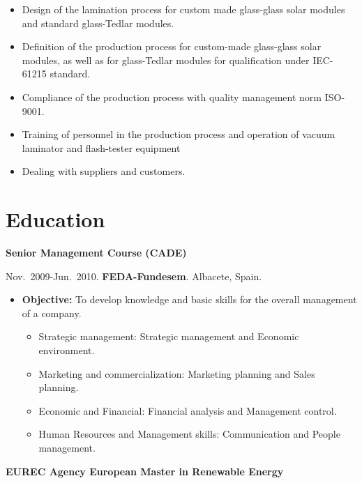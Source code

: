 \documentclass{article}
\begin{document}
\begin{itemize}\itemsep 0pt
\item Design of the lamination process for custom made glass-glass solar modules and standard glass-Tedlar modules.
\item Definition of the production process for custom-made glass-glass solar modules, as well as for glass-Tedlar modules for qualification under IEC-61215 standard.
\item Compliance of the production process with quality management norm ISO-9001.
\item Training of personnel in the production process and operation of vacuum laminator and flash-tester equipment
\item Dealing with suppliers and customers.
\end{itemize}


\section*{Education}

{\bf Senior Management Course (CADE)}

\medskip
Nov.~2009-Jun.~2010. {\bf FEDA-Fundesem}. Albacete, Spain.

\begin{itemize}\itemsep 0pt
\item {\bf Objective:} To develop knowledge and basic skills for the overall management of a company.
\begin{itemize} 
\item Strategic management:  Strategic management and Economic environment.
\item Marketing and commercialization:  Marketing planning and Sales planning.
\item Economic and Financial:  Financial analysis and Management control.
\item Human Resources and Management skills:  Communication and  People management.
\end{itemize}
\end{itemize}


\medskip
{\bf EUREC Agency European Master in Renewable Energy}
\end{document}
